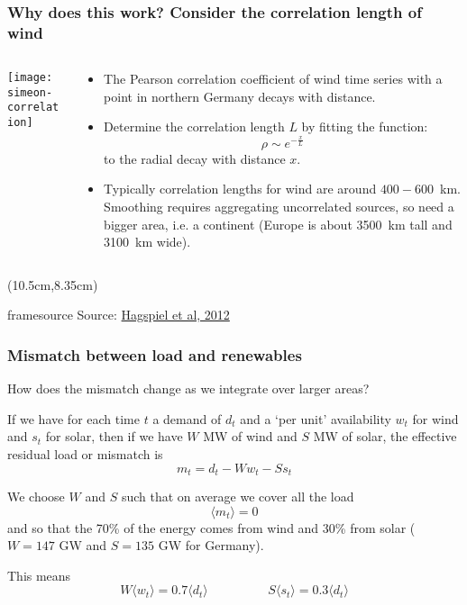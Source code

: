 \documentclass[10pt,aspectratio=169,dvipsnames]{beamer}
\newcommand{\source}[1]{\begin{textblock*}{5cm}(10.5cm,8.35cm)
    \begin{beamercolorbox}[ht=0.5cm,right]{framesource}
        \usebeamerfont{framesource}\usebeamercolor[fg]{framesource} Source: {#1}
    \end{beamercolorbox}
\end{textblock*}}
\let\olditem\item
\renewcommand{\item}{%
\olditem\vspace{5pt}}
\begin{document}
\begin{frame}
  \frametitle{Why does this work? Consider the correlation length of wind}


  \begin{columns}[T]
  \begin{column}{5.5cm}
    \texttt{[image: simeon-correlation]}
  \end{column}
  \begin{column}{7.5cm}
    \vspace{0.2cm}
    \begin{itemize}
      \item The Pearson correlation coefficient of wind time series with a point in
        northern Germany decays with distance.
      \item Determine the \alert{correlation length} $L$ by fitting the
        function:
        \begin{equation*}
          \rho \sim e^{-\frac{x}{L}}
        \end{equation*}
        to the radial decay with distance $x$.
      \item Typically correlation lengths for wind are around $400-600$~km. Smoothing requires aggregating uncorrelated sources, so need a bigger area, i.e. a continent (Europe is about 3500~km tall and 3100~km wide).
    \end{itemize}

  \end{column}
\end{columns}


  \source{\href{https://doi.org/10.1016/j.apenergy.2011.10.039}{Hagspiel et al, 2012}}
\end{frame}



\begin{frame}
  \frametitle{Mismatch between load and renewables}

  How does the mismatch change as we integrate over larger areas?

  If we have for each time $t$ a demand of $d_t$ and a `per unit'
  availability $w_t$ for wind and $s_t$ for solar, then if we have $W$
  MW of wind and $S$ MW of solar, the effective \alert{residual load}
  or \alert{mismatch} is
  \begin{equation*}
    m_t = d_t - Ww_t - Ss_t
  \end{equation*}

  We choose $W$ and $S$ such that on \alert{average} we cover all the load
  \begin{equation*}
    \langle m_t \rangle = 0
  \end{equation*}
  and so that the 70\% of the energy comes from wind and 30\% from solar ($W = 147$ GW and $S = 135$ GW for Germany).

  This means
  \begin{equation*}
    W\langle w_t \rangle = 0.7\langle d_t \rangle  \hspace{2cm} S\langle s_t \rangle = 0.3\langle d_t \rangle
  \end{equation*}

\end{frame}
\end{document}
